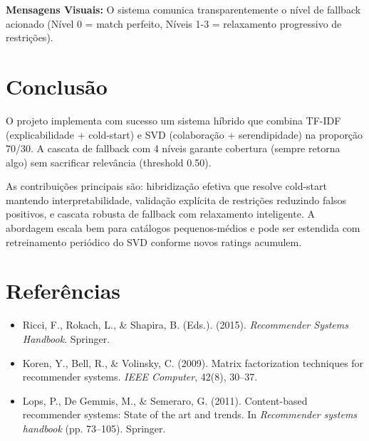 \documentclass[12pt,a4paper]{article}
\begin{document}
\textbf{Mensagens Visuais:} O sistema comunica transparentemente o nível de fallback acionado (Nível 0 = match perfeito, Níveis 1-3 = relaxamento progressivo de restrições).

\section{Conclusão}

O projeto implementa com sucesso um sistema híbrido que combina TF-IDF (explicabilidade + cold-start) e SVD (colaboração + serendipidade) na proporção 70/30. A cascata de fallback com 4 níveis garante cobertura (sempre retorna algo) sem sacrificar relevância (threshold 0.50).

As contribuições principais são: hibridização efetiva que resolve cold-start mantendo interpretabilidade, validação explícita de restrições reduzindo falsos positivos, e cascata robusta de fallback com relaxamento inteligente. A abordagem escala bem para catálogos pequenos-médios e pode ser estendida com retreinamento periódico do SVD conforme novos ratings acumulem.

\section*{Referências}

\begin{itemize}
    \item Ricci, F., Rokach, L., \& Shapira, B. (Eds.). (2015). \textit{Recommender Systems Handbook}. Springer.
    
    \item Koren, Y., Bell, R., \& Volinsky, C. (2009). Matrix factorization techniques for recommender systems. \textit{IEEE Computer}, 42(8), 30--37.
    
    \item Lops, P., De Gemmis, M., \& Semeraro, G. (2011). Content-based recommender systems: State of the art and trends. In \textit{Recommender systems handbook} (pp. 73--105). Springer.
\end{itemize}
\end{document}

